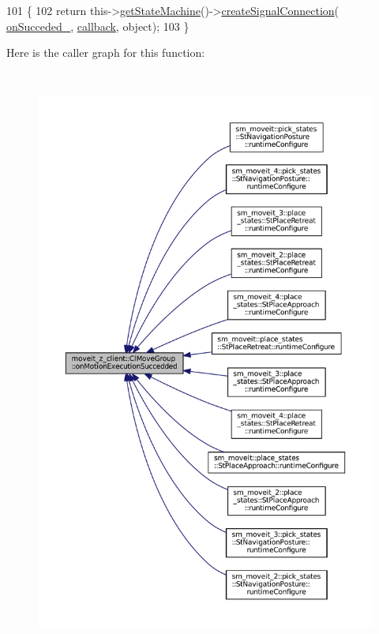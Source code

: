 \begin{DoxyCode}
101   \{
102     \textcolor{keywordflow}{return} this->\hyperlink{classsmacc_1_1ISmaccClient_aec51d4712404cb9882b86e4c854bb93a}{getStateMachine}()->\hyperlink{classsmacc_1_1ISmaccStateMachine_adf0f42ade0c65cc471960fe2a7c42da2}{createSignalConnection}(
      \hyperlink{classmoveit__z__client_1_1ClMoveGroup_a77804970cc1e2ae64e26dabbf556352d}{onSucceded\_}, \hyperlink{servers_2opencv__perception__node_2opencv__perception__node_8cpp_a050e697bd654facce10ea3f6549669b3}{callback}, \textcolor{keywordtype}{object});
103   \}
\end{DoxyCode}
Here is the caller graph for this function\+:
\nopagebreak
\begin{figure}[H]
\begin{center}
\leavevmode
\includegraphics[height=550pt]{classmoveit__z__client_1_1ClMoveGroup_a4c3a7340e1e52015ccd61a94dba152c0_icgraph}
\end{center}
\end{figure}
\mbox{\label{classmoveit__z__client_1_1ClMoveGroup_a42bede73264ae2d5dfe0117315042acb}} 
